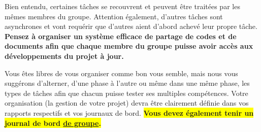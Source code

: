 \documentclass[10pt, fleqn, a4paper]{article}
\newcommand{\bfcolor}[2]{\textcolor{#1}{\textbf{#2}}}
\begin{document}
Bien entendu, certaines tâches se recouvrent et peuvent être traitées par les mêmes membres du groupe. Attention également, d'autres tâches sont \og{}asynchrones\fg{} et vont requérir que d'autres aient d'abord achevé leur propre tâche. \bfcolor{redCM}{Pensez à organiser un système efficace de partage de codes et de documents afin que chaque membre du groupe puisse avoir accès aux développements du projet \og{}à jour\fg{}.}

Vous êtes libres de vous organiser comme bon vous semble, mais nous vous suggérons d'alterner, d'une phase à l'autre ou même dans une même phase, les types de tâches afin que chacun puisse tester ses multiples compétences. Votre organisation (la gestion de votre projet) devra être clairement définie dans vos rapports respectifs et vos journaux de bord. \colorbox{yellow}{\bfcolor{redCM}{Vous devez également tenir un journal de bord \underline{de groupe}.}}
\end{document}
